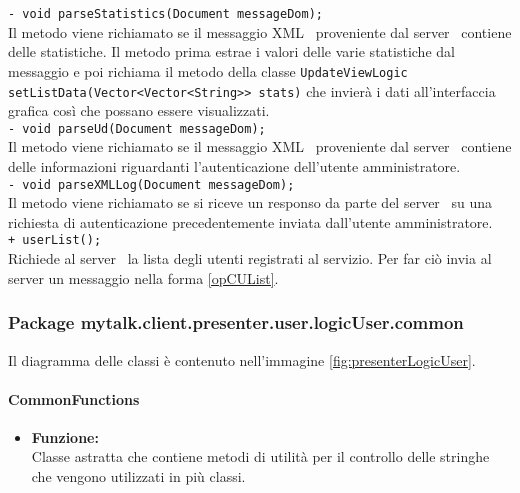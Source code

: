 {{\begin{sloppypar}
{{\begin{itemize}
{					\texttt{- void parseStatistics(Document messageDom);}\\
					Il metodo viene richiamato se il messaggio XML\g~ proveniente dal server\g~ contiene delle statistiche. Il metodo prima estrae i valori delle varie statistiche dal messaggio e poi richiama il metodo della classe \texttt{UpdateViewLogic setListData(Vector<Vector<String>> stats)} che invierà i dati all'interfaccia grafica così che possano essere visualizzati.\\
					
					\texttt{- void parseUd(Document messageDom);}\\
					Il metodo viene richiamato se il messaggio XML\g~ proveniente dal server\g~ contiene delle informazioni riguardanti l'autenticazione dell'utente amministratore.\\
					
					\texttt{- void parseXMLLog(Document messageDom);}\\
					Il metodo viene richiamato se si riceve un responso da parte del server\g~ su una richiesta di autenticazione precedentemente inviata dall'utente amministratore.\\
					
					\texttt{+ userList();}\\
						Richiede al server\g~ la lista degli utenti registrati al servizio. Per far ciò invia al server un messaggio nella forma \ref{opCUList}.\\
				}
			\end{itemize}
			}

	}
	
	
	
	\subsubsection{Package mytalk.client.presenter.user.logicUser.common }{
		Il diagramma delle classi è contenuto nell'immagine \ref{fig:presenterLogicUser}.

		\paragraph{CommonFunctions}\label{par:CommonFunctions}{
			\begin{itemize}
				\item[] \textbf{Funzione:}{\\
				Classe astratta che contiene metodi di utilità per il controllo delle stringhe che vengono utilizzati in più classi.\\
				}
			

\end{itemize}}}
\end{sloppypar}}}
